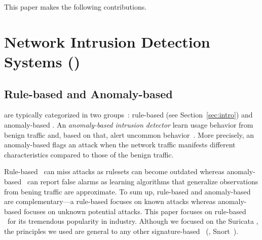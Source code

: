 \documentclass[sigconf,review, anonymous]{acmart}
\begin{document}



This paper makes the following contributions.

\section{Network Intrusion Detection Systems (\nids)}
\label{sec:background}

\subsection{Rule-based and Anomaly-based \nids}

\sloppy \nids{} are typically categorized in two
groups~\cite{kumar2007survey}: rule-based (see
Section~\ref{sec:intro}) and anomaly-based \nids. An
\emph{anomaly-based intrusion detector} learn usage behavior from
benign traffic and, based on that, alert uncommon
behavior~\cite{7579764,kumar2007survey,Mitchell:2014:SID:2597757.2542049,cordy-etal-issta19}. More
precisely, an anomaly-based \nids{} flags an attack when the network
traffic manifests different characteristics compared to those of the
benign traffic.

Rule-based \nids\ can miss attacks as rulesets can become outdated
whereas anomaly-based \nids\ can report false alarms as learning
algorithms that generalize observations from bening traffic are
approximate. To sum up, rule-based \nids{} and anomaly-based \nids{}
are complementary---a rule-based \nids{} focuses on known attacks
whereas anomaly-based \nids{} focuses on unknown potential attacks.
This paper focuses on rule-based \nids\ for its tremendous popularity
in industry. Although we focused on the Suricata \nids, the principles
we used are general to any other signature-based \nids~(\eg{},
Snort~\cite{snort}).
\end{document}
